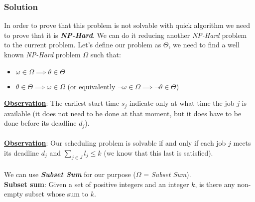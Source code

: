 \documentclass[11pt]{article}
\begin{document}
\subsubsection*{Solution}
In order to prove that this problem is not solvable with quick algorithm we need to prove that it is \textbf{\textit{NP-Hard}}. We can do it reducing another \textit{NP-Hard} problem to the current problem. Let's define our problem as $\Theta$, we need to find a well known \textit{NP-Hard} problem $\Omega$ such that:
\begin{itemize}
	\item $\omega \in \Omega \implies  \theta \in \Theta$
	\item $\theta \in \Theta \implies  \omega \in \Omega$ (or equivalently $\neg\omega \in \Omega \implies  \neg\theta \in \Theta$)
\end{itemize}
\textbf{\underline{Observation}}: The earliest start time  $s_j$ indicate only at what time the job $j$ is available (it does not need to be done at that moment, but it does have to be done before its deadline $d_j$). \\ \\
\textbf{\underline{Observation}}: Our scheduling problem is solvable if and only if each job $j$ meets its deadline $d_j$ and $\sum\limits_{j \in J}l_j \le k$ (we know that this last is satisfied). \\ \\
We can use \textbf{\textit{Subset Sum}} for our purpose ($\Omega$ = \textit{Subset Sum}). \\
\textbf{Subset sum}: Given a set of positive integers and an integer $k$, is there any non-empty subset whose sum to $k$.
\end{document}
